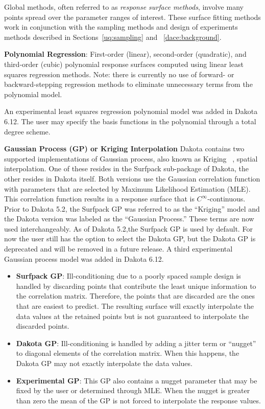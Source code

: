 Global methods, often referred to as \emph{response surface methods},
involve many points spread over the parameter ranges of interest.
These surface fitting methods work in conjunction with the sampling
methods and design of experiments methods described in
Sections~\ref{uq:sampling} and ~\ref{dace:background}.

\textbf{Polynomial Regression}: First-order (linear), second-order
(quadratic), and third-order (cubic) polynomial response surfaces
computed using linear least squares regression methods. Note: there is
currently no use of forward- or backward-stepping regression methods
to eliminate unnecessary terms from the polynomial model.

An experimental least squares regression polynomial model was added
in Dakota 6.12. The user may specify the basis functions in the
polynomial through a total degree scheme.

\textbf{Gaussian Process (GP) or Kriging Interpolation}
Dakota contains two supported implementations of Gaussian process, also known as 
Kriging ~\cite{Giu98}, spatial interpolation.  One of these resides in 
the Surfpack sub-package of Dakota, the other resides in Dakota itself.
Both versions use the Gaussian correlation function with parameters that
are selected by Maximum Likelihood Estimation (MLE). This correlation 
function results in a response surface that is $C^\infty$-continuous.
Prior to Dakota 5.2, the Surfpack GP was referred to as the ``Kriging'' 
model and the Dakota version was labeled as the ``Gaussian Process.''  
These terms are now used interchangeably.  As of Dakota 5.2,the 
Surfpack GP is used by default.  For now the user still has the option 
to select the Dakota GP, but the Dakota GP is deprecated and will be 
removed in a future release. A third experimental Gaussian process model
was added in Dakota 6.12.
\begin{itemize}
\item \textbf{Surfpack GP}: Ill-conditioning due to a poorly spaced sample 
      design is handled by discarding points that contribute the least 
      unique information to the correlation matrix.  Therefore, the points 
      that are discarded are the ones that are easiest to predict.  The 
      resulting surface will exactly interpolate the data values at the 
      retained points but is not guaranteed to interpolate the discarded 
      points.
\item \textbf{Dakota GP}: Ill-conditioning is handled by adding a jitter 
      term or ``nugget'' to diagonal elements of the correlation matrix. 
      When this happens, the Dakota GP may not exactly interpolate the 
      data values.
\item \textbf{Experimental GP}: This GP also contains a nugget parameter
      that may be fixed by the user or determined through MLE. When the nugget
      is greater than zero the mean of the GP is not forced to interpolate
      the response values.
\end{itemize}

